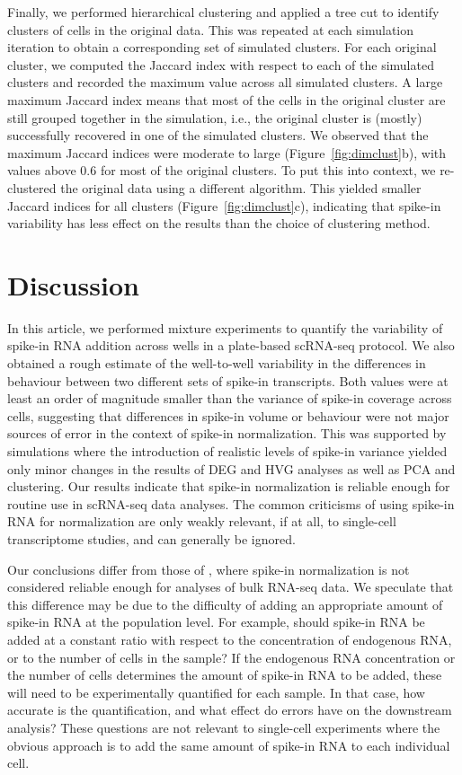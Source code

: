 \documentclass{article}
\begin{document}
Finally, we performed hierarchical clustering and applied a tree cut to identify clusters of cells in the original data.
This was repeated at each simulation iteration to obtain a corresponding set of simulated clusters.
For each original cluster, we computed the Jaccard index with respect to each of the simulated clusters and recorded the maximum value across all simulated clusters.
A large maximum Jaccard index means that most of the cells in the original cluster are still grouped together in the simulation,
i.e., the original cluster is (mostly) successfully recovered in one of the simulated clusters.
We observed that the maximum Jaccard indices were moderate to large (Figure~\ref{fig:dimclust}b), with values above 0.6 for most of the original clusters.
To put this into context, we re-clustered the original data using a different algorithm.
This yielded smaller Jaccard indices for all clusters (Figure~\ref{fig:dimclust}c), indicating that spike-in variability has less effect on the results than the choice of clustering method.

\section*{Discussion}
In this article, we performed mixture experiments to quantify the variability of spike-in RNA addition across wells in a plate-based scRNA-seq protocol.
We also obtained a rough estimate of the well-to-well variability in the differences in behaviour between two different sets of spike-in transcripts.
Both values were at least an order of magnitude smaller than the variance of spike-in coverage across cells, suggesting that differences in spike-in volume or behaviour were not major sources of error in the context of spike-in normalization.
This was supported by simulations where the introduction of realistic levels of spike-in variance yielded only minor changes in the results of DEG and HVG analyses as well as PCA and clustering.
Our results indicate that spike-in normalization is reliable enough for routine use in scRNA-seq data analyses.
The common criticisms of using spike-in RNA for normalization are only weakly relevant, if at all, to single-cell transcriptome studies, and can generally be ignored.

Our conclusions differ from those of \citet{risso2014normalization}, where spike-in normalization is not considered reliable enough for analyses of bulk RNA-seq data.
We speculate that this difference may be due to the difficulty of adding an appropriate amount of spike-in RNA at the population level.
For example, should spike-in RNA be added at a constant ratio with respect to the concentration of endogenous RNA, or to the number of cells in the sample?
If the endogenous RNA concentration or the number of cells determines the amount of spike-in RNA to be added, these will need to be experimentally quantified for each sample.
In that case, how accurate is the quantification, and what effect do errors have on the downstream analysis?
These questions are not relevant to single-cell experiments where the obvious approach is to add the same amount of spike-in RNA to each individual cell.
\end{document}
